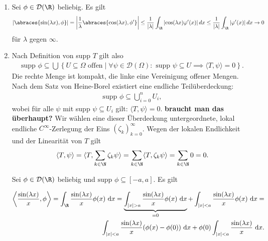 \begin{solution}
\phantom{}
\begin{enumerate}[label = (\roman*)]
	\item Sei $\phi \in \mathcal{D}(\R)$ beliebig. Es gilt
	\begin{align*}
	\left|\abraces{\sin(\lambda x), \phi}\right| = \left|\frac{1}{\lambda}\abraces{\cos(\lambda x), \phi^\prime}\right| \leq \frac{1}{|\lambda|} \int_\R \left|\cos(\lambda x) \varphi^\prime(x)\right| dx \leq \frac{1}{|\lambda|} \int_\R \left|\varphi^\prime(x)\right| dx \rightarrow 0
	\end{align*}
	für $\lambda$ gegen $\infty$.
	\item Nach Definition von supp $T$ gilt also
\begin{align}
    \text{supp~}\phi \subseteq \bigcup \left\{U \subseteq \Omega \text{~offen} \mid \forall \psi \in \mathcal{D}(\Omega): \text{~supp~}\psi \subseteq U \implies \langle T, \psi\rangle = 0 \right\}.
\end{align}
Die rechte Menge ist kompakt, die linke eine Vereinigung offener Mengen. Nach dem Satz von Heine-Borel existiert eine endliche Teilüberdeckung:
\begin{align}
     \text{supp~}\phi \subseteq \bigcup_{i = 0}^n U_i,
\end{align}
wobei für alle $\psi$ mit supp $\psi \subseteq U_i$ gilt: $\langle T, \psi\rangle = 0.$ \textbf{braucht man das überhaupt?}
Wir wählen eine dieser Überdeckung untergeordnete, lokal endliche $C^\infty$-Zerlegung der Eins $(\zeta_k)_{k=0}^\infty$. Wegen der lokalen Endlichkeit und der Linearität von $T$ gilt
\begin{align}
    \langle T, \psi \rangle = \langle T, \sum_{k \in \N} \zeta_k \psi \rangle = \sum_{k \in \N} \langle T, \zeta_k \psi \rangle = \sum_{k \in \N} 0 = 0.
\end{align}


Sei $\phi \in \mathcal{D}(\R)$ beliebig und $\text{supp~}\phi \subseteq [-a,a]$. Es gilt

\begin{align}
    \left\langle \frac{\sin(\lambda x)}{x}, \phi\right\rangle =
    \int_\R \frac{\sin(\lambda x)}{x} \phi(x) \text{~d}x=
    \underbrace{\int_{|x| > a} \frac{\sin(\lambda x)}{x} \phi(x) \text{~d}x}_{= 0} +
    \int_{|x| < a} \frac{\sin(\lambda x)}{x} \phi(x) \text{~d}x = \\
    \int_{|x| < a} \frac{\sin(\lambda x)}{x} (\phi(x) - \phi(0)) \text{~d}x + \phi(0) \int_{|x| < a} \frac{\sin(\lambda x)}{x} \text{~d}x.
\end{align}


\end{enumerate}
\end{solution}
